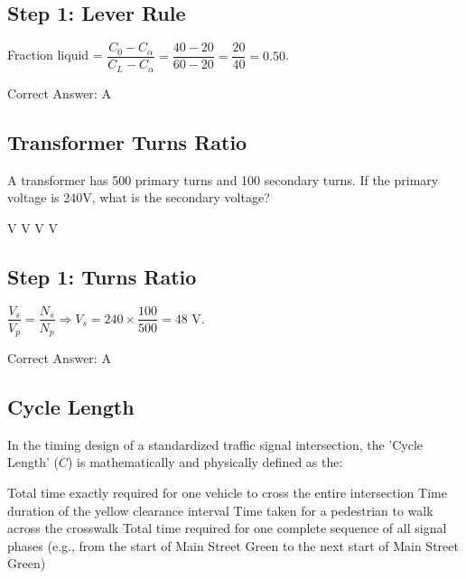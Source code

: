 \begin{choices}
\end{choices}

\begin{solution}

\subsection*{Step 1: Lever Rule}
Fraction liquid = $\dfrac{C_0 - C_\alpha}{C_L - C_\alpha} = \dfrac{40 - 20}{60 - 20} = \dfrac{20}{40} = 0.50$.

Correct Answer: A
\end{solution}

\clearpage

\subsection{Transformer Turns Ratio}

A transformer has 500 primary turns and 100 secondary turns. If the primary voltage is 240V, what is the secondary voltage?

\begin{choices}
     V
     V
     V
     V
\end{choices}

\begin{solution}

\subsection*{Step 1: Turns Ratio}
$\dfrac{V_s}{V_p} = \dfrac{N_s}{N_p} \Rightarrow V_s = 240 \times \dfrac{100}{500} = 48$ V.

Correct Answer: A
\end{solution}

\clearpage

\subsection{Cycle Length}

In the timing design of a standardized traffic signal intersection, the 'Cycle Length' ($C$) is mathematically and physically defined as the:

\begin{choices}
    \choice Total time exactly required for one vehicle to cross the entire intersection
    \choice Time duration of the yellow clearance interval
    \choice Time taken for a pedestrian to walk across the crosswalk
    \correctchoice Total time required for one complete sequence of all signal phases (e.g., from the start of Main Street Green to the next start of Main Street Green)
\end{choices}

